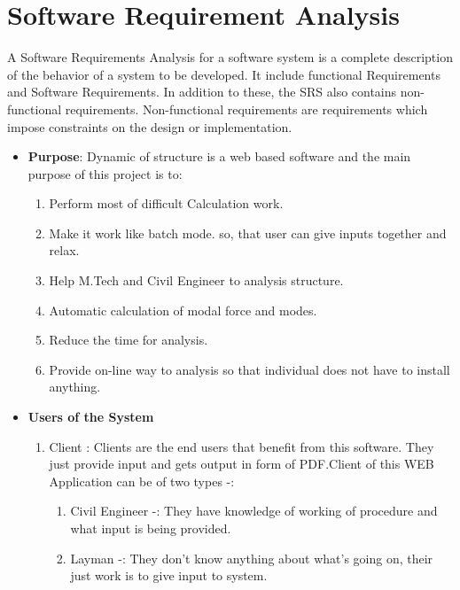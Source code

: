 \section{Software Requirement Analysis}

A Software Requirements Analysis for a software system is a complete 
description of the behavior of a system to be developed. It include functional Requirements
and Software Requirements. In addition to these, the SRS also contains 
non-functional requirements. Non-functional requirements are 
requirements which impose constraints on the design or implementation.
\begin{itemize}
\item{\bf Purpose}: Dynamic of structure is a web based software and the 
main purpose of this project is to:
\begin{enumerate}
\item Perform most of difficult Calculation work.
\item Make it work like batch mode. so, that user can give inputs 
together and relax.
\item Help M.Tech and Civil Engineer to analysis structure.
\item Automatic calculation of modal force and modes.
\item Reduce the time for analysis.
\item Provide on-line way to analysis so that individual does not have to 
install anything.
\end{enumerate}

\item{\bf Users of the System}
\begin{enumerate} 
\item Client : Clients are the end users that benefit from this software.
They just provide input and gets output in form of PDF.Client of this 
WEB Application can be of two types -:
\begin{enumerate}
\item Civil Engineer -: They have knowledge of working of procedure
and what input is being provided.
\item Layman -: They don't know anything about what's going on, their just 
work is to give input to system.   
 
\end{enumerate}
\end{enumerate}
\end{itemize}

